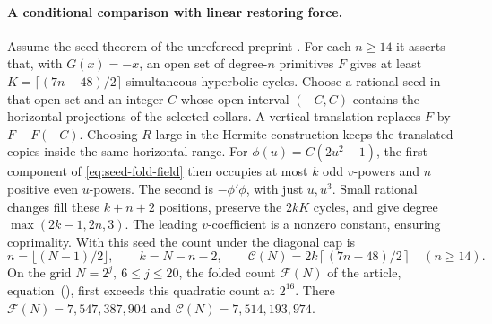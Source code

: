 \paragraph{A conditional comparison with linear restoring force.}
Assume the seed theorem of the unrefereed preprint \cite[Theorem~1.1]{LuClassical}. For each \(n\ge14\) it asserts that, with \(G(x)=-x\), an open set of degree-\(n\) primitives \(F\) gives at least \(K=\lceil(7n-48)/2\rceil\) simultaneous hyperbolic cycles. Choose a rational seed in that open set and an integer \(C\) whose open interval \((-C,C)\) contains the horizontal projections of the selected collars. A vertical translation replaces \(F\) by \(F-F(-C)\). Choosing \(R\) large in the Hermite construction keeps the translated copies inside the same horizontal range. For \(\phi(u)=C(2u^2-1)\), the first component of \eqref{eq:seed-fold-field} then occupies at most \(k\) odd \(v\)-powers and \(n\) positive even \(u\)-powers. The second is \(-\phi'\phi\), with just \(u,u^3\). Small rational changes fill these \(k+n+2\) positions, preserve the \(2kK\) cycles, and give degree \(\max(2k-1,2n,3)\). The leading \(v\)-coefficient is a nonzero constant, ensuring coprimality. With this seed the count under the diagonal cap is
\[
 n=\lfloor(N-1)/2\rfloor,\qquad k=N-n-2,\qquad
 \mathcal C(N)=2k\left\lceil(7n-48)/2\right\rceil\quad(n\ge14).
\]
On the grid \(N=2^j,\ 6\le j\le20\), the folded count \(\mathcal F(N)\) of the article, equation~(), first exceeds this quadratic count at \(2^{16}\). There \(\mathcal F(N)=7{,}547{,}387{,}904\) and \(\mathcal C(N)=7{,}514{,}193{,}974\).
